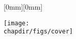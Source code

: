\thispagestyle{empty}
\raisebox{0mm}[0mm][0mm]{%
\parbox{8.5in}{
\vspace*{236mm}\hspace{-38.5mm}\texttt{[image: \\chapdir/figs/cover]}\\
}
}%
\\


